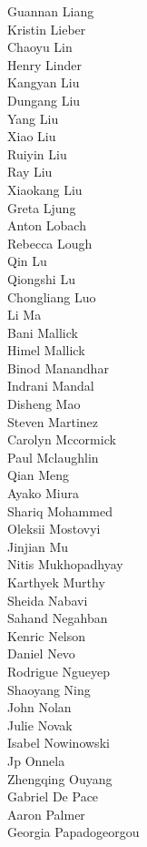 Guannan Liang\\
Kristin Lieber\\
Chaoyu Lin\\
Henry Linder\\
Kangyan Liu\\
Dungang Liu\\
Yang Liu\\
Xiao Liu\\
Ruiyin Liu\\
Ray Liu\\
Xiaokang  Liu\\
Greta Ljung\\
Anton Lobach\\
Rebecca Lough\\
Qin Lu\\
Qiongshi Lu\\
Chongliang Luo\\
Li Ma\\
Bani Mallick\\
Himel Mallick\\
Binod Manandhar\\
Indrani Mandal\\
Disheng Mao\\
Steven  Martinez\\
Carolyn Mccormick\\
Paul Mclaughlin\\
Qian Meng\\
Ayako Miura\\
Shariq Mohammed\\
Oleksii Mostovyi\\
Jinjian Mu\\
Nitis Mukhopadhyay\\
Karthyek Murthy\\
Sheida Nabavi\\
Sahand Negahban\\
Kenric Nelson\\
Daniel Nevo\\
Rodrigue Ngueyep\\
Shaoyang Ning\\
John Nolan\\
Julie Novak\\
Isabel Nowinowski\\
Jp Onnela\\
Zhengqing Ouyang\\
Gabriel De Pace\\
Aaron Palmer\\
Georgia Papadogeorgou\\

